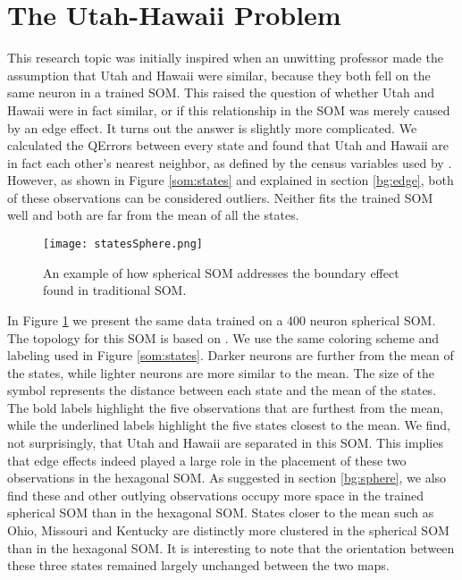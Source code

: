 \section{The Utah-Hawaii Problem}
\label{states}
This research topic was initially inspired when an unwitting professor made
the assumption that Utah and Hawaii were similar, because they both fell on
the same neuron in a trained SOM.  This raised the question of whether Utah and
Hawaii were in fact similar, or if this relationship in the SOM was merely
caused by an edge effect.  It turns out the answer is slightly more
complicated.  We calculated the QErrors between every state and found that
Utah and Hawaii are in fact each other's nearest neighbor, as
defined by the census variables used by \cite{skupin08}.  However, as shown in
Figure \ref{som:states} and explained in section \ref{bg:edge}, both of these
observations can be considered outliers.  Neither fits the trained SOM well and both are
far from the mean of all the states.

\begin{figure}[h]
\centering
\texttt{[image: statesSphere.png]}
\caption{An example of how spherical SOM addresses the boundary effect found in
traditional SOM.}
\label{sphere:states}
\end{figure}

In Figure \ref{sphere:states} we present the same data trained on a 400 neuron
spherical SOM.  The topology for this SOM is based on \cite{Rakhmanov94}.  We
use the same coloring scheme and labeling used in Figure \ref{som:states}.
Darker neurons are further from the mean of the states, while lighter neurons
are more similar to the mean.  The size of the symbol represents the distance
between each state and the mean of the states.  The bold labels highlight the
five observations that are furthest from the mean, while the underlined labels
highlight the five states closest to the mean.  We find, not surprisingly, that
Utah and Hawaii are separated in this SOM.  This implies that edge effects indeed
played a large role in the placement of these two observations in the hexagonal
SOM.  As suggested in section \ref{bg:sphere}, we also find these and other
outlying observations occupy more space in the trained spherical SOM than in
the hexagonal SOM.  States closer to the mean such as Ohio, Missouri and
Kentucky are distinctly more clustered in the spherical SOM than in
the hexagonal SOM.  It is interesting to note that the orientation between
these three states remained largely unchanged between the two maps.

